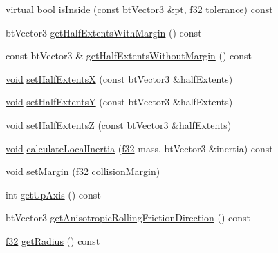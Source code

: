 \begin{DoxyCompactItemize}
\item 
virtual bool \mbox{\hyperlink{classnjli_1_1_physics_shape_cylinder_a74ebf6b5c2ca835e1cfaaa1bec156ef3}{is\+Inside}} (const bt\+Vector3 \&pt, \mbox{\hyperlink{_util_8h_a5f6906312a689f27d70e9d086649d3fd}{f32}} tolerance) const
\item 
bt\+Vector3 \mbox{\hyperlink{classnjli_1_1_physics_shape_cylinder_a528cb67c172a04787f7f1fa8239dc205}{get\+Half\+Extents\+With\+Margin}} () const
\item 
const bt\+Vector3 \& \mbox{\hyperlink{classnjli_1_1_physics_shape_cylinder_aae8b9aef78ec51c51ed8a3fe875df5b4}{get\+Half\+Extents\+Without\+Margin}} () const
\item 
\mbox{\hyperlink{_thread_8h_af1e856da2e658414cb2456cb6f7ebc66}{void}} \mbox{\hyperlink{classnjli_1_1_physics_shape_cylinder_a685026badc2ed6c9bd64ec4784fbfd15}{set\+Half\+ExtentsX}} (const bt\+Vector3 \&half\+Extents)
\item 
\mbox{\hyperlink{_thread_8h_af1e856da2e658414cb2456cb6f7ebc66}{void}} \mbox{\hyperlink{classnjli_1_1_physics_shape_cylinder_afac940ffcb588c11962642b4d0329d10}{set\+Half\+ExtentsY}} (const bt\+Vector3 \&half\+Extents)
\item 
\mbox{\hyperlink{_thread_8h_af1e856da2e658414cb2456cb6f7ebc66}{void}} \mbox{\hyperlink{classnjli_1_1_physics_shape_cylinder_ab11198a4980fc34eed9c4c4d53bb41e1}{set\+Half\+ExtentsZ}} (const bt\+Vector3 \&half\+Extents)
\item 
\mbox{\hyperlink{_thread_8h_af1e856da2e658414cb2456cb6f7ebc66}{void}} \mbox{\hyperlink{classnjli_1_1_physics_shape_cylinder_a844ba3ec7a53212951e0b2b9021a6832}{calculate\+Local\+Inertia}} (\mbox{\hyperlink{_util_8h_a5f6906312a689f27d70e9d086649d3fd}{f32}} mass, bt\+Vector3 \&inertia) const
\item 
\mbox{\hyperlink{_thread_8h_af1e856da2e658414cb2456cb6f7ebc66}{void}} \mbox{\hyperlink{classnjli_1_1_physics_shape_cylinder_ab264eaa033bd9f0d19030290c12b58b4}{set\+Margin}} (\mbox{\hyperlink{_util_8h_a5f6906312a689f27d70e9d086649d3fd}{f32}} collision\+Margin)
\item 
int \mbox{\hyperlink{classnjli_1_1_physics_shape_cylinder_a540d188e51168afbcc758b0ddeb74c9f}{get\+Up\+Axis}} () const
\item 
bt\+Vector3 \mbox{\hyperlink{classnjli_1_1_physics_shape_cylinder_ad725634ae3a5f9b140db0847ed6b10a2}{get\+Anisotropic\+Rolling\+Friction\+Direction}} () const
\item 
\mbox{\hyperlink{_util_8h_a5f6906312a689f27d70e9d086649d3fd}{f32}} \mbox{\hyperlink{classnjli_1_1_physics_shape_cylinder_a7827d143353f66b460e6cd679da4ae2e}{get\+Radius}} () const
\end{DoxyCompactItemize}
